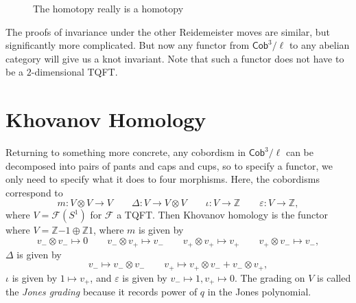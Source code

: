 \documentclass[leqno, openany]{memoir}
\theoremstyle{definition}
\theoremstyle{remark}
\theoremstyle{plain}
\theoremstyle{definition}
\theoremstyle{remark}
\newcommand{\Z}{\mathbb{Z}}
\newcommand{\ep}{\varepsilon}
\newcommand{\mc}[1]{\mathcal{#1}}
\newcommand{\ms}[1]{\mathsf{#1}}
\newcommand{\1}{\mathbf{1}}
\newcommand{\2}{\mathbf{2}}
\newcommand{\3}{\mathbf{3}}
\begin{document}
\begin{figure}[H]
    \caption{The homotopy really is a homotopy}%
    \label{fig:seb6}
\end{figure}

The proofs of invariance under the other Reidemeister moves are similar, but significantly more complicated. But now any functor from $\ms{Cob}^3/\ell$ to any abelian category will give us a knot invariant. Note that such a functor does not have to be a $2$-dimensional TQFT.

\section{Khovanov Homology}%
\label{sec:khovanov_homology}

Returning to something more concrete, any cobordism in $\ms{Cob}^3/\ell$ can be decomposed into pairs of pants and caps and cups, so to specify a functor, we only need to specify what it does to four morphisms. Here, the cobordisms correspond to
\[ m \colon V \otimes V \to V \qquad \Delta \colon V \to V \otimes V \qquad \iota \colon V \to \Z \qquad \ep \colon V \to \Z, \]
where $V = \mc{F}(S^1)$ for $\mc{F}$ a TQFT. Then Khovanov homology is the functor where $V = \Z \qty{-1} \oplus \Z \qty{1}$, where $m$ is given by
\[ v_- \otimes v_- \mapsto 0 \qquad v_- \otimes v_+ \mapsto v_- \qquad v_+ \otimes v_+ \mapsto v_+ \qquad v_+ \otimes v_- \mapsto v_- ,\]
$\Delta$ is given by
\[ v_- \mapsto v_- \otimes v_- \qquad v_+ \mapsto v_+ \otimes v_- + v_- \otimes v_+, \]
$\iota$ is given by $1 \mapsto v_+$, and $\ep$ is given by $v_- \mapsto 1, v_+ \mapsto 0$. The grading on $V$ is called the \textit{Jones grading} because it records power of $q$ in the Jones polynomial.
\end{document}
